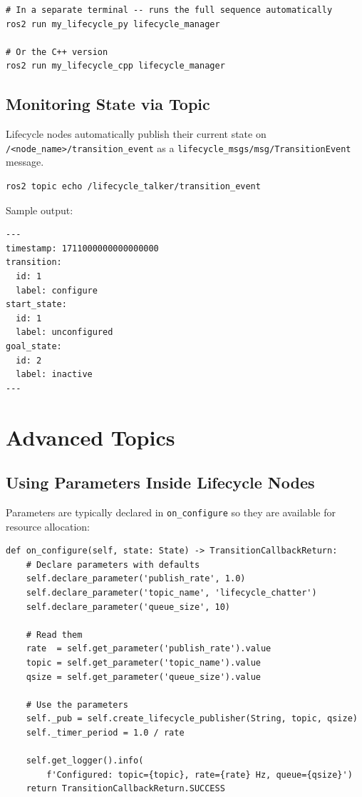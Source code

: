 \documentclass[12pt,a4paper]{article}
\newcommand{\code}[1]{\texttt{#1}}
\begin{document}
\begin{lstlisting}[style=bash,caption={Run the lifecycle manager}]
# In a separate terminal -- runs the full sequence automatically
ros2 run my_lifecycle_py lifecycle_manager

# Or the C++ version
ros2 run my_lifecycle_cpp lifecycle_manager
\end{lstlisting}

\subsection{Monitoring State via Topic}

Lifecycle nodes automatically publish their current state on
\code{/<node\_name>/transition\_event} as a
\code{lifecycle\_msgs/msg/TransitionEvent} message.

\begin{lstlisting}[style=bash,caption={Monitor state transitions}]
ros2 topic echo /lifecycle_talker/transition_event
\end{lstlisting}

Sample output:
\begin{lstlisting}[style=bash]
---
timestamp: 1711000000000000000
transition:
  id: 1
  label: configure
start_state:
  id: 1
  label: unconfigured
goal_state:
  id: 2
  label: inactive
---
\end{lstlisting}

\section{Advanced Topics}
\label{sec:advanced}

\subsection{Using Parameters Inside Lifecycle Nodes}

Parameters are typically declared in \code{on\_configure} so they are
available for resource allocation:

\begin{lstlisting}[style=python,caption={Declaring parameters in on\_configure (Python)}]
def on_configure(self, state: State) -> TransitionCallbackReturn:
    # Declare parameters with defaults
    self.declare_parameter('publish_rate', 1.0)
    self.declare_parameter('topic_name', 'lifecycle_chatter')
    self.declare_parameter('queue_size', 10)

    # Read them
    rate  = self.get_parameter('publish_rate').value
    topic = self.get_parameter('topic_name').value
    qsize = self.get_parameter('queue_size').value

    # Use the parameters
    self._pub = self.create_lifecycle_publisher(String, topic, qsize)
    self._timer_period = 1.0 / rate

    self.get_logger().info(
        f'Configured: topic={topic}, rate={rate} Hz, queue={qsize}')
    return TransitionCallbackReturn.SUCCESS
\end{lstlisting}
\end{document}
